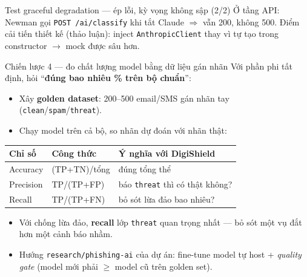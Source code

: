 \documentclass[aspectratio=169,12pt]{beamer}
\begin{document}
\begin{frame}{Test graceful degradation --- ép lỗi, kỳ vọng không sập (2/2)}
  \small Ở tầng API: Newman gọi \texttt{POST /ai/classify} khi tắt Claude $\Rightarrow$ vẫn \alert{200}, không 500. Điểm cải tiến thiết kế (thảo luận): inject \texttt{AnthropicClient} thay vì tự tạo trong constructor $\rightarrow$ mock được sâu hơn.
\end{frame}

\begin{frame}{Chiến lược 4 --- đo chất lượng model bằng dữ liệu gán nhãn}
  \small Với phần phi tất định, hỏi ``\textbf{đúng bao nhiêu \% trên bộ chuẩn}'':
  \begin{itemize}
    \item Xây \textbf{golden dataset}: 200--500 email/SMS gán nhãn tay (\texttt{clean}/\texttt{spam}/\texttt{threat}).
    \item Chạy model trên cả bộ, so nhãn dự đoán với nhãn thật:
  \end{itemize}
  \begin{table}
    \footnotesize
    \begin{tabular}{@{}lll@{}}
      \toprule
      \textbf{Chỉ số} & \textbf{Công thức} & \textbf{Ý nghĩa với DigiShield} \\
      \midrule
      Accuracy & (TP+TN)/tổng & đúng tổng thể \\
      Precision & TP/(TP+FP) & báo \texttt{threat} thì có thật không? \\
      Recall & TP/(TP+FN) & \alert{bỏ sót lừa đảo bao nhiêu?} \\
      \bottomrule
    \end{tabular}
  \end{table}
  \vspace{-0.4em}
  \begin{itemize}
    \item Với chống lừa đảo, \textbf{recall} lớp \texttt{threat} quan trọng nhất --- bỏ sót một vụ đắt hơn một cảnh báo nhầm.
    \item Hướng \texttt{research/phishing-ai} của dự án: fine-tune model tự host + \emph{quality gate} (model mới phải $\geq$ model cũ trên golden set).
  \end{itemize}
\end{frame}
\end{document}
